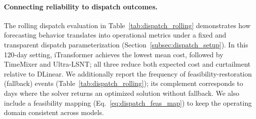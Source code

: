 \documentclass[review,3p,times]{elsarticle}
\begin{document}
\begin{table}[t]
\centering
\caption{Network-constrained dispatch on IEEE RTS-24 (two-stage DA/RT DC-OPF, $w_{\max}=260$~MW, 120 days). We report the real-time (RT) objective value in RTS-24 cost units (not directly comparable to CNY), the total wind curtailment, the total \emph{emergency slack generation} (expensive balancing generator at the slack bus), and the congestion-hour ratio. \textbf{OPF success ratio} counts an hour as successful only if both the day-ahead and real-time DC-OPF instances return \texttt{success}; the denominator is $120\times24=2880$ hours.}
\label{tab:dispatch_network_rts24}
\begingroup
\setlength{\tabcolsep}{4pt}
\small
{}
\endgroup
\end{table}
\paragraph{Connecting reliability to dispatch outcomes.}\label{subsec:disc_dispatch}
The rolling dispatch evaluation in Table~\ref{tab:dispatch_rolling} demonstrates how forecasting behavior translates into operational metrics under a fixed and transparent dispatch parameterization (Section~\ref{subsec:dispatch_setup}). In this 120-day setting, iTransformer achieves the lowest mean cost, followed by TimeMixer and Ultra-LSNT; all three reduce both expected cost and curtailment relative to DLinear. We additionally report the frequency of feasibility-restoration (fallback) events (Table~\ref{tab:dispatch_rolling}); its complement corresponds to days where the solver returns an optimized solution without fallback. We also include a feasibility mapping (Eq.~\ref{eq:dispatch_feas_map}) to keep the operating domain consistent across models.
\end{document}
